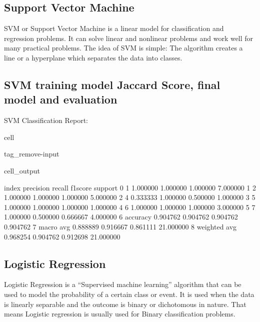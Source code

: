 \documentclass[letterpaper,10pt,english]{jupyterBook}
\begin{document}
\subsection{Support Vector Machine}
\label{\detokenize{analysis:support-vector-machine}}
\sphinxAtStartPar
SVM or Support Vector Machine is a linear model for classification and regression problems.
It can solve linear and non\sphinxhyphen{}linear problems and work well for many practical problems.
The idea of SVM is simple: The algorithm creates a line or a hyperplane which separates the
data into classes.


\subsection{SVM training model Jaccard Score, final model and evaluation}
\label{\detokenize{analysis:svm-training-model-jaccard-score-final-model-and-evaluation}}
\sphinxAtStartPar
SVM Classification Report:

\begin{sphinxuseclass}{cell}
\begin{sphinxuseclass}{tag_remove-input}\begin{sphinxVerbatimOutput}

\begin{sphinxuseclass}{cell_output}
\begin{sphinxVerbatim}[commandchars=\\\{\}]
          index  precision    recall  f1\PYGZhy{}score    support
0             1   1.000000  1.000000  1.000000   7.000000
1             2   1.000000  1.000000  1.000000   5.000000
2             4   0.333333  1.000000  0.500000   1.000000
3             5   1.000000  1.000000  1.000000   1.000000
4             6   1.000000  1.000000  1.000000   3.000000
5             7   1.000000  0.500000  0.666667   4.000000
6      accuracy   0.904762  0.904762  0.904762   0.904762
7     macro avg   0.888889  0.916667  0.861111  21.000000
8  weighted avg   0.968254  0.904762  0.912698  21.000000
\end{sphinxVerbatim}

\end{sphinxuseclass}\end{sphinxVerbatimOutput}

\end{sphinxuseclass}
\end{sphinxuseclass}

\subsection{Logistic Regression}
\label{\detokenize{analysis:logistic-regression}}
\sphinxAtStartPar
Logistic Regression is a “Supervised machine learning” algorithm that can be used to model the probability of a certain class or event. It is used when the data is linearly separable and the outcome is binary or dichotomous in nature. That means Logistic regression is usually used for Binary classification problems.
\end{document}

